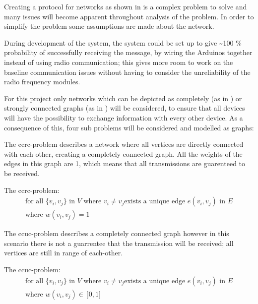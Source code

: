 Creating a protocol for networks as shown in  is a complex problem to solve and many issues will become apparent throughout analysis of the problem.
In order to simplify the problem some assumptions are made about the network.

During development of the system, the system could be set up to give \textasciitilde100 \% probability of successfully receiving the message, by wiring the Arduinos together instead of using radio communication; this gives more room to work on the baseline communication issues without having to consider the unreliability of the radio frequency modules.

For this project only networks which can be depicted as completely (as in ) or strongly connected graphs (as in ) will be considered, to ensure that all devices will have the possibility to exchange information with every other device.
As a consequence of this, four sub problems will be considered and modelled as graphs:

\bigskip

\noindent The \gls{ccrc}-problem describes a network where all vertices are directly connected with each other, creating a completely connected graph.
All the weights of the edges in this graph are 1, which means that all transmissions are guarenteed to be received. 	

\begin{definition}
	The \acrshort{ccrc}-problem:
	\begin{align*}
		\text{for all } \{v_i, v_j\} \text{ in } V \text{ where } v_i \neq v_j \text{exists a unique edge } e(v_i, v_j) \text{ in } E\\
		\text{where } w(v_i, v_j) = 1
	\end{align*}
\end{definition}

\noindent The \gls{ccuc}-problem describes a completely connected graph however in this scenario there is not a guarrentee that the transmission will be received; all vertices are still in range of each-other.

\begin{definition}
	The \acrshort{ccuc}-problem:
	\begin{align*}
		\text{for all } \{v_i, v_j\} \text{ in } V \text{ where } v_i \neq v_j \text{exists a unique edge } e(v_i, v_j) \text{ in } E\\
		\text{where } w(v_i, v_j) \in\ ]0, 1]
	\end{align*}
\end{definition} 

